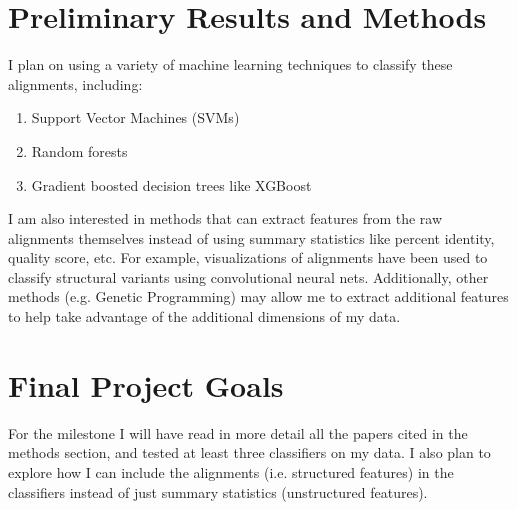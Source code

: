 \documentclass{article}
\begin{document}
\section*{Preliminary Results and Methods}
I plan on using a variety of machine learning techniques to classify these alignments, including: 
\begin{enumerate}
    \item Support Vector Machines (SVMs) \parencite{Hastie2008}
    \item Random forests \parencite{Ho1995, Breiman2001}
    \item Gradient boosted decision trees like XGBoost \parencite{Chen2016b} 
\end{enumerate}
I am also interested in methods that can extract features from the raw alignments themselves instead of using summary statistics like percent identity, quality score, etc. For example, visualizations of alignments have been used to classify structural variants using convolutional neural nets. Additionally, other methods (e.g. Genetic Programming) may allow me to extract additional features \parencite{Ahmed2014} to help take advantage of the additional dimensions of my data. 
 
\section*{Final Project Goals}
For the milestone I will have read in more detail all the papers cited in the methods section, and tested at least three classifiers on my data. I also plan to explore how I can include the alignments (i.e. structured features) in the classifiers instead of just summary statistics (unstructured features). 

\printbibliography 
\end{document}
